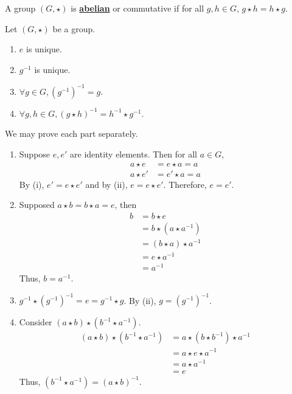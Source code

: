 \documentclass[11pt,letterpaper]{book}
\newcommand{\define}[1]{\underline{\textbf{#1}}}
\newcommand{\pn}[1]{\left( #1 \right)}
\theoremstyle{definition}
\begin{document}
\begin{defi}
    A group $(G,\star)$ is \define{abelian} or commutative if for all $g,h\in G$, $g\star h=h\star g$.
\end{defi}

\begin{bthm}
    Let $(G,\star)$ be a group.
    \begin{enumerate}
        \item $e$ is unique.
        \item $g^{-1}$ is unique.
        \item $\forall g\in G, \pn{g^{-1}}^{-1}=g$.
        \item $\forall g,h\in G, (g\star h)^{-1}=h^{-1}\star g^{-1}$.
    \end{enumerate}
\end{bthm}

\begin{bpf}
    We may prove each part separately.
    \begin{enumerate}
        \item Suppose $e,e'$ are identity elements. Then for all $a\in G$,
            \begin{align*}
                a\star e&=e\star a=a\tag*{(i)}\\
                a\star e'&=e'\star a=a\tag*{(ii)}
            \end{align*}
            By (i), $e'=e\star e'$ and by (ii), $e=e\star e'$. Therefore, $e=e'$.
        \item Supposed $a\star b=b\star a=e$, then
            \begin{align*}
                b&=b\star e\\
                 &=b\star(a\star a^{-1})\\
                 &=(b\star a)\star a^{-1}\\
                 &=e\star a^{-1}\\
                 &=a^{-1}
            \end{align*}
            Thus, $b=a^{-1}$.
        \item $g^{-1}\star \pn{g^{-1}}^{-1}=e=g^{-1}\star g$. By (ii), $g=\pn{g^{-1}}^{-1}$.
        \item Consider $(a\star b)\star(b^{-1}\star a^{-1})$.
            \begin{align*}
                (a\star b)\star(b^{-1}\star a^{-1})&=a\star(b\star b^{-1})\star a^{-1}\\
                                                   &=a\star e\star a^{-1}\\
                                                   &=a\star a^{-1}\\
                                                   &=e
            \end{align*}
            Thus, $(b^{-1}\star a^{-1})=(a\star b)^{-1}$.
    \end{enumerate}
\end{bpf}
\end{document}

